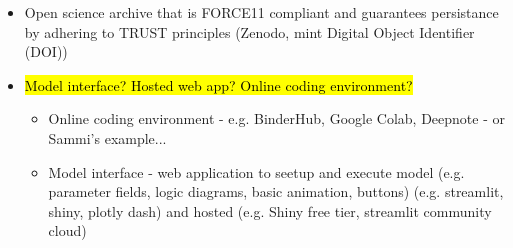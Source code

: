 \begin{itemize}
    \item Open science archive that is FORCE11 compliant and guarantees persistance by adhering to TRUST principles (Zenodo, mint Digital Object Identifier (DOI))\autocite{monks_towards_2024}
    \item \hl{Model interface? Hosted web app? Online coding environment?}
    \begin{itemize}
        \item Online coding environment - e.g. BinderHub, Google Colab, Deepnote - or Sammi's example...
        \item Model interface - web application to seetup and execute model (e.g. parameter fields, logic diagrams, basic animation, buttons) (e.g. streamlit, shiny, plotly dash) and hosted (e.g. Shiny free tier, streamlit community cloud)
    \end{itemize}
\end{itemize}

